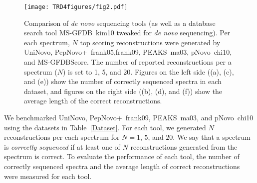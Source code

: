 \begin{figure*}[!tpb]
\centerline{\texttt{[image: TRD4figures/fig2.pdf]}}
\caption{\footnotesize  Comparison of {\em de novo} sequencing tools (as well as a database search tool MS-GFDB~\cite{unv}{kim10} tweaked for {\em de novo} sequencing). Per each spectrum, $N$ top scoring reconstructions were generated by UniNovo, PepNovo+~\cite{unv}{frank05,frank09}, PEAKS~\cite{unv}{ma03}, pNovo~\cite{unv}{chi10}, and MS-GFDBScore. 
The number of reported reconstructions per a spectrum ($N$) is set to 1, 5, and 20. 
Figures on the left side ((a), (c), and (e)) show the number of  correctly sequenced spectra in each dataset, and figures on the right side ((b), (d), and (f)) show the average length of the correct reconstructions.  }\label{FIG:3}
\end{figure*}






We benchmarked UniNovo, PepNovo+~\cite{unv}{frank09}, PEAKS~\cite{unv}{ma03}, and pNovo~\cite{unv}{chi10} using the  datasets in Table~\ref{Dataset}. For each tool, we generated $N$  reconstructions per each spectrum for $N=1$, $5$, and $20$. We say that a spectrum is {\em correctly sequenced} if at least one of $N$ reconstructions generated from the spectrum is correct. To evaluate the performance of each tool, the number of correctly sequenced spectra and the average length of correct reconstructions were measured for each tool.


